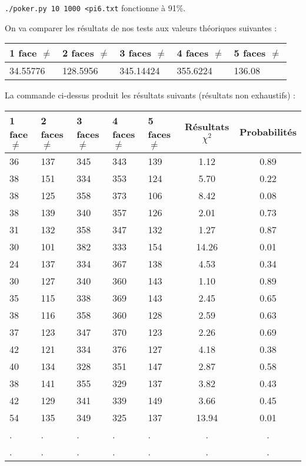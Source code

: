 \documentclass[12pt,a4paper]{article}
\begin{document}
\texttt{./poker.py 10 1000 <pi6.txt} fonctionne à 91\%.

On va comparer les résultats de nos tests aux valeurs théoriques suivantes :
\begin{center}
\begin{tabular}{|l|l|l|l|l|}
\hline
1 face $\neq$ & 2 faces $\neq$  & 3 faces $\neq$ & 4 faces $\neq$ & 5 faces $\neq$\\
\hline \hline
34.55776 & 128.5956 & 345.14424 & 355.6224 & 136.08\\ \hline
\end{tabular}
\end{center}
La commande ci-dessus produit les résultats suivants (résultats non exhaustifs) : 
\begin{center}
\begin{tabular}{|l|l|l|l|l|c|c|}
\hline
1 face $\neq$ & 2 faces $\neq$  & 3 faces $\neq$ & 4 faces $\neq$ & 5 faces $\neq$ & Résultats $\chi^2$ & Probabilités \\
\hline \hline
36 & 137 & 345 & 343 & 139 &  1.12 &  0.89\\ \hline
38 & 151 & 334 & 353 & 124 &  5.70 &  0.22\\ \hline
38 & 125 & 358 & 373 & 106 &  8.42 &  0.08\\ \hline
38 & 139 & 340 & 357 & 126 &  2.01 &  0.73\\ \hline
31 & 132 & 358 & 347 & 132 &  1.27 &  0.87\\ \hline
30 & 101 & 382 & 333 & 154 & 14.26 &  0.01\\ \hline
24 & 137 & 334 & 367 & 138 &  4.53 &  0.34\\ \hline
30 & 127 & 340 & 360 & 143 &  1.10 &  0.89\\ \hline
35 & 115 & 338 & 369 & 143 &  2.45 &  0.65\\ \hline
38 & 116 & 358 & 360 & 128 &  2.59 &  0.63\\ \hline
37 & 123 & 347 & 370 & 123 &  2.26 &  0.69\\ \hline
42 & 121 & 334 & 376 & 127 &  4.18 &  0.38\\ \hline
40 & 134 & 328 & 351 & 147 &  2.87 &  0.58\\ \hline
38 & 141 & 355 & 329 & 137 &  3.82 &  0.43\\ \hline
42 & 129 & 341 & 339 & 149 &  3.66 &  0.45\\ \hline
54 & 135 & 349 & 325 & 137 & 13.94 &  0.01\\ \hline
 . & . & . & . & . & . & . \\ \hline
 . & . & . & . & . & . & . \\ \hline

\end{tabular}
\end{center}
\end{document}
